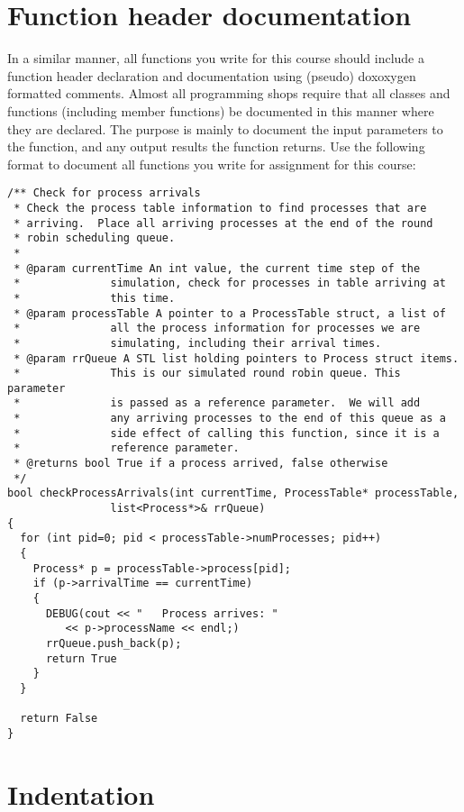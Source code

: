 \documentclass[11pt]{article}
\begin{document}
\section*{Function header documentation}
\label{sec-3}

In a similar manner, all functions you write for this course should
include a function header declaration and documentation using (pseudo)
doxoxygen formatted comments.  Almost all programming shops require
that all classes and functions (including member functions) be
documented in this manner where they are declared.  The purpose is
mainly to document the input parameters to the function, and any
output results the function returns.  Use the following format to
document all functions you write for assignment for this course:

\begin{verbatim}
/** Check for process arrivals
 * Check the process table information to find processes that are
 * arriving.  Place all arriving processes at the end of the round
 * robin scheduling queue.
 *
 * @param currentTime An int value, the current time step of the
 *              simulation, check for processes in table arriving at
 *              this time.
 * @param processTable A pointer to a ProcessTable struct, a list of
 *              all the process information for processes we are
 *              simulating, including their arrival times.
 * @param rrQueue A STL list holding pointers to Process struct items.
 *              This is our simulated round robin queue. This parameter
 *              is passed as a reference parameter.  We will add
 *              any arriving processes to the end of this queue as a
 *              side effect of calling this function, since it is a
 *              reference parameter.
 * @returns bool True if a process arrived, false otherwise 
 */
bool checkProcessArrivals(int currentTime, ProcessTable* processTable, 
			    list<Process*>& rrQueue)
{
  for (int pid=0; pid < processTable->numProcesses; pid++)
  {
    Process* p = processTable->process[pid];
    if (p->arrivalTime == currentTime)
    {
      DEBUG(cout << "   Process arrives: " 
		 << p->processName << endl;)
      rrQueue.push_back(p);
      return True
    }
  }

  return False
}
\end{verbatim}
\section*{Indentation}
\label{sec-4}
\end{document}
